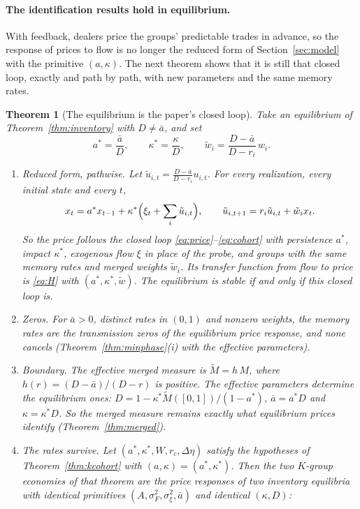 \documentclass[12pt]{article}
\newtheorem{theorem}{Theorem}[section]
\theoremstyle{definition}
\theoremstyle{remark}
\begin{document}
\paragraph{The identification results hold in equilibrium.} With feedback, dealers price the groups' predictable trades in advance, so the response of prices to flow is no longer the reduced form of Section~\ref{sec:model} with the primitive $(a,\kappa)$. The next theorem shows that it is still that closed loop, exactly and path by path, with new parameters and the same memory rates.

\begin{theorem}[The equilibrium is the paper's closed loop]\label{thm:eqreduced}
Take an equilibrium of Theorem~\ref{thm:inventory} with $D\ne\bar a$, and set
\[
 a^*=\frac{\bar a}{D},\qquad \kappa^*=\frac{\kappa}{D},\qquad \tilde w_i=\frac{D-\bar a}{D-r_i}\,w_i .
\]
\begin{enumerate}[label=(\roman*),itemsep=1pt]
\item \emph{Reduced form, pathwise.} Let $\tilde u_{i,t}=\frac{D-\bar a}{D-r_i}u_{i,t}$. For every realization, every initial state and every $t$,
\[
 x_t=a^*x_{t-1}+\kappa^*\Bigl(\xi_t+\sum_i\tilde u_{i,t}\Bigr),\qquad \tilde u_{i,t+1}=r_i\tilde u_{i,t}+\tilde w_ix_t .
\]
So the price follows the closed loop \eqref{eq:price}--\eqref{eq:cohort} with persistence $a^*$, impact $\kappa^*$, exogenous flow $\xi$ in place of the probe, and groups with the same memory rates and merged weights $\tilde w_i$. Its transfer function from flow to price is \eqref{eq:H} with $(a^*,\kappa^*,\tilde w)$. The equilibrium is stable if and only if this closed loop is.
\item \emph{Zeros.} For $\bar a>0$, distinct rates in $(0,1)$ and nonzero weights, the memory rates are the transmission zeros of the equilibrium price response, and none cancels (Theorem~\ref{thm:minphase}(i) with the effective parameters).
\item \emph{Boundary.} The effective merged measure is $\tilde M=h\,M$, where $h(r)=(D-\bar a)/(D-r)$ is positive. The effective parameters determine the equilibrium ones: $D=1-\kappa^*\tilde M([0,1])/(1-a^*)$, $\bar a=a^*D$ and $\kappa=\kappa^*D$. So the merged measure remains exactly what equilibrium prices identify (Theorem~\ref{thm:merged}).
\item \emph{The rates survive.} Let $(a^*,\kappa^*,W,r_c,\Delta\eta)$ satisfy the hypotheses of Theorem~\ref{thm:kcohort} with $(a,\kappa)=(a^*,\kappa^*)$. Then the two $K$-group economies of that theorem are the price responses of two inventory equilibria with identical primitives $(A,\sigma_F^2,\sigma_\xi^2,\bar a)$ and identical $(\kappa,D)$:

\end{enumerate}
\end{theorem}
\end{document}
